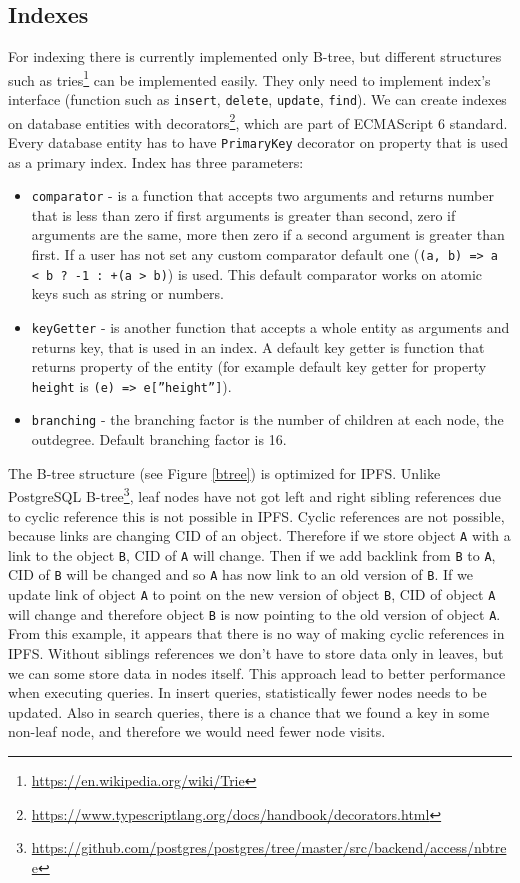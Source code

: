 \subsection{Indexes}
For indexing there is currently implemented only B-tree, but different structures such as tries\footnote{\url{https://en.wikipedia.org/wiki/Trie}} can be implemented easily. They only need to implement index's interface (function such as \texttt{insert}, \texttt{delete}, \texttt{update}, \texttt{find}). We can create indexes on database entities with decorators\footnote{\url{https://www.typescriptlang.org/docs/handbook/decorators.html}}, which are part of ECMAScript 6 standard. Every database entity has to have \texttt{PrimaryKey} decorator on property that is used as a primary index. Index has three parameters:
\begin{itemize}
    \item \texttt{comparator} - is a function that accepts two arguments and returns number that is less than zero if first arguments is greater than second, zero if arguments are the same, more then zero if a second argument is greater than first. If a user has not set any custom comparator default one (\texttt{(a, b) =>
    a < b ? -1 : +(a > b)}) is used. This default comparator works on atomic keys such as string or numbers. 
    \item \texttt{keyGetter} - is another function that accepts a whole entity as arguments and returns key, that is used in an index. A default key getter is function that returns property of the entity (for example default key getter for property \texttt{height} is \texttt{(e) =>  e[''height'']}).
    \item \texttt{branching} - the branching factor is the number of children at each node, the outdegree. Default branching factor is 16.
\end{itemize}

The B-tree structure (see Figure \ref{btree}) is optimized for IPFS. Unlike PostgreSQL B-tree\footnote{\url{https://github.com/postgres/postgres/tree/master/src/backend/access/nbtree}}, leaf nodes have not got left and right sibling references due to cyclic reference this is not possible in IPFS. Cyclic references are not possible, because links are changing CID of an object. Therefore if we store object \texttt{A} with a link to the object \texttt{B}, CID of \texttt{A} will change. Then if we add backlink from \texttt{B} to \texttt{A}, CID of \texttt{B} will be changed and so \texttt{A} has now link to an old version of \texttt{B}. If we update link of object \texttt{A} to point on the new version of object \texttt{B}, CID of object \texttt{A} will change and therefore object \texttt{B} is now pointing to the old version of object \texttt{A}. From this example, it appears that there is no way of making cyclic references in IPFS. Without siblings references we don't have to store data only in leaves, but we can some store data in nodes itself. This approach lead to better performance when executing queries. In insert queries, statistically fewer nodes needs to be updated. Also in search queries, there is a chance that we found a key in some non-leaf node, and therefore we would need fewer node visits.

